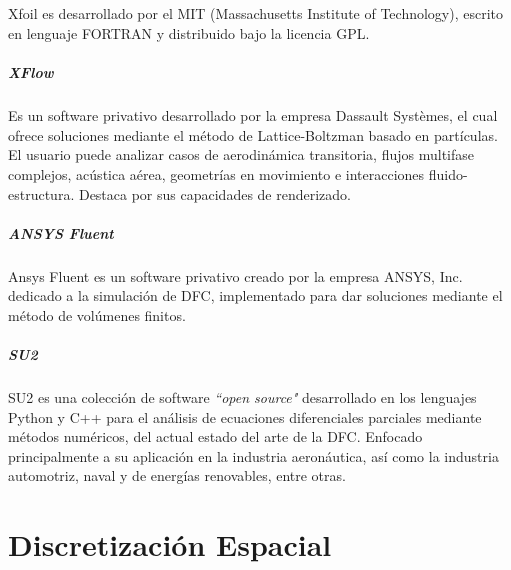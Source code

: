 \documentclass[letterpaper, openright, 12pt]{book}
\begin{document}
				\paragraph*{}
					Xfoil es desarrollado por el MIT (Massachusetts Institute of Technology), escrito en lenguaje FORTRAN y distribuido bajo la licencia GPL.
				
				\paragraph*{XFlow}
				\paragraph*{}
					Es un software privativo desarrollado por la empresa Dassault Systèmes, el cual ofrece soluciones mediante el método de Lattice-Boltzman basado en partículas. El usuario puede analizar casos de aerodinámica transitoria, flujos multifase complejos, acústica aérea, geometrías en movimiento e interacciones fluido-estructura. Destaca por sus capacidades de renderizado.\cite{xflow}
				
				\paragraph*{ANSYS Fluent}
				\paragraph*{}
					Ansys Fluent es un software privativo creado por la empresa ANSYS, Inc. dedicado a la simulación de DFC, implementado para dar soluciones mediante el método de volúmenes finitos.
					
				\paragraph*{SU2}
				\paragraph*{}
					SU2 es una colección de software \textit{``open source"} desarrollado en los lenguajes Python y C++ para el análisis de ecuaciones diferenciales parciales mediante métodos numéricos, del actual estado del arte de la DFC. Enfocado principalmente a su aplicación en la industria aeronáutica, así como la industria automotriz, naval y de energías renovables, entre otras.\cite{SU2}
				
	\chapter{Discretización Espacial} \label{chap:discretizacion-espacial}
\end{document}
